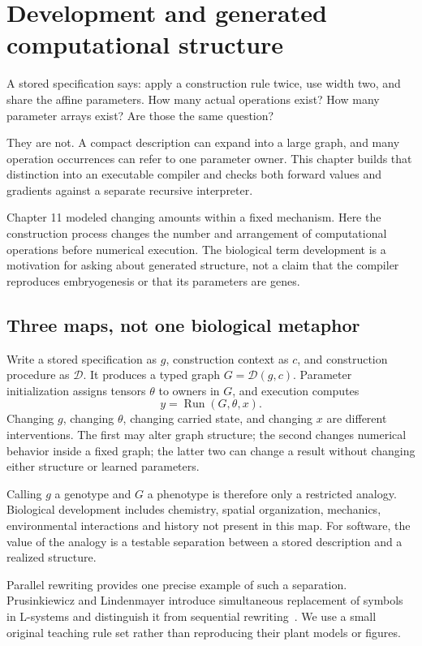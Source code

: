 \chapter{Development and generated computational structure}
A stored specification says: apply a construction rule twice, use width
two, and share the affine parameters. How many actual operations exist?
How many parameter arrays exist? Are those the same question?

They are not. A compact description can expand into a large graph, and
many operation occurrences can refer to one parameter owner. This chapter
builds that distinction into an executable compiler and checks both forward
values and gradients against a separate recursive interpreter.

Chapter 11 modeled changing amounts within a fixed mechanism. Here the
construction process changes the number and arrangement of computational
operations before numerical execution. The biological term development is
a motivation for asking about generated structure, not a claim that the
compiler reproduces embryogenesis or that its parameters are genes.

\section{Three maps, not one biological metaphor}
Write a stored specification as $g$, construction context as $c$, and
construction procedure as $\mathcal D$. It produces a typed graph
$G=\mathcal D(g,c)$. Parameter initialization assigns tensors $\theta$
to owners in $G$, and execution computes
\begin{equation}
 y=\operatorname{Run}(G,\theta,x).
\end{equation}
Changing $g$, changing $\theta$, changing carried state, and changing $x$
are different interventions. The first may alter graph structure; the second
changes numerical behavior inside a fixed graph; the latter two can change a
result without changing either structure or learned parameters.

Calling $g$ a genotype and $G$ a phenotype is therefore only a restricted
analogy. Biological development includes chemistry, spatial organization,
mechanics, environmental interactions and history not present in this map.
For software, the value of the analogy is a testable separation between a
stored description and a realized structure.

Parallel rewriting provides one precise example of such a separation.
Prusinkiewicz and Lindenmayer introduce simultaneous replacement of symbols
in L-systems and distinguish it from sequential rewriting~\cite{abop}.
We use a small original teaching rule set rather than reproducing their
plant models or figures.

